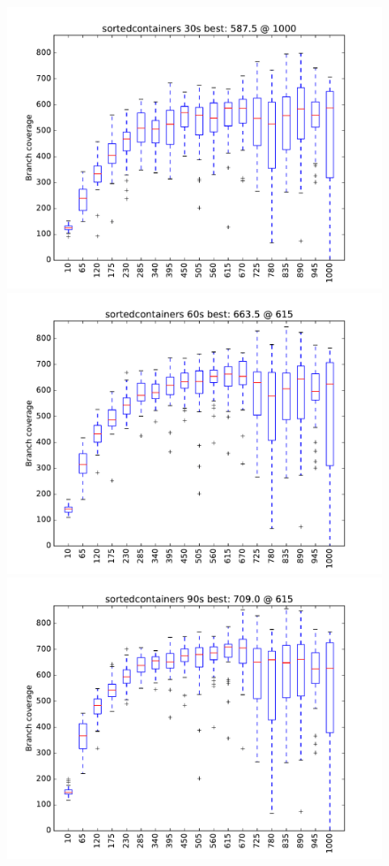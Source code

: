 \begin{figure}
\includegraphics[width=\columnwidth]{graphs/sortedcontainersrand30}
\includegraphics[width=\columnwidth]{graphs/sortedcontainersrand60}
\includegraphics[width=\columnwidth]{graphs/sortedcontainersrand90}
\end{figure}

